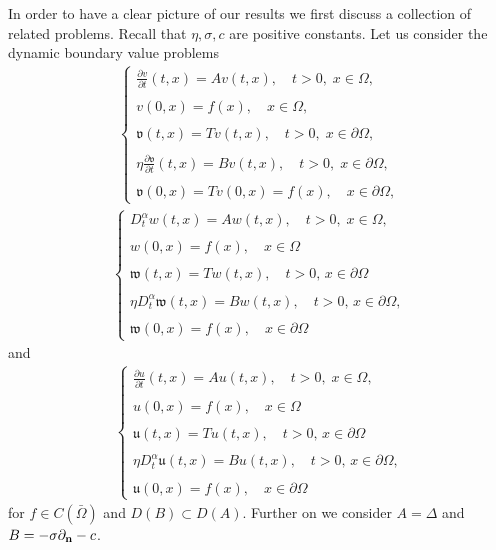 \documentclass[11pt,a4paper]{article}
\begin{document}
In order to have a clear picture of our results we first discuss a collection of related problems. Recall that $\eta, \sigma, c$ are positive constants. Let us consider the dynamic boundary value problems
\begin{align}
\left\lbrace
\begin{array}{ll}
\displaystyle \frac{\partial v}{\partial t}(t,x) = A v(t,x), \quad t>0, \; x \in \Omega,\\
\\
\displaystyle v(0,x) = f(x), \quad x \in \Omega,\\
\\
\displaystyle \mathfrak{v}(t,x) = Tv(t,x), \quad t>0, \; x \in \partial \Omega,\\ 
\\
\displaystyle \eta \frac{\partial \mathfrak{v}}{\partial t} (t,x) = B v(t,x), \quad t>0,\; x \in \partial \Omega,\\
\\
\displaystyle \mathfrak{v}(0,x) = Tv(0,x) = f(x), \quad x \in \partial \Omega,
\end{array}
\right .
\label{probX}
\end{align}
\begin{align}
\left\lbrace
\begin{array}{l}
\displaystyle D^\alpha_t w(t,x) = A w(t,x), \quad t>0, \; x \in \Omega, \\
\\
\displaystyle w(0,x) = f(x), \quad x \in \Omega\\
\\
\displaystyle \mathfrak{w}(t,x)= Tw(t,x), \quad t>0,\, x \in \partial \Omega\\
\\
\displaystyle \eta D^\alpha_t \mathfrak{w}(t,x) = B w(t,x), \quad t>0,\, x \in \partial \Omega,\\
\\
\displaystyle \mathfrak{w}(0,x) = f(x), \quad x \in \partial \Omega
\end{array}
\right .
\label{probXL1}
\end{align}
and
\begin{align}
\left\lbrace
\begin{array}{l}
\displaystyle \frac{\partial u}{\partial t}(t,x) = A u(t,x), \quad t>0, \; x \in \Omega, \\
\\
\displaystyle u(0,x) = f(x), \quad x \in \Omega\\
\\
\displaystyle \mathfrak{u}(t,x)= Tu(t,x), \quad t>0,\, x \in \partial \Omega\\
\\
\displaystyle \eta D^\alpha_t \mathfrak{u}(t,x) = B u(t,x), \quad t>0,\, x \in \partial \Omega,\\
\\
\displaystyle \mathfrak{u}(0,x) = f(x), \quad x \in \partial \Omega
\end{array}
\right .
\label{probXbar1}
\end{align}
for $f \in C(\bar{\Omega})$ and $D(B) \subset D(A)$. Further on we consider $A=\Delta $ and $B = -\sigma \partial_{\bf n} - c$. 
\end{document}
